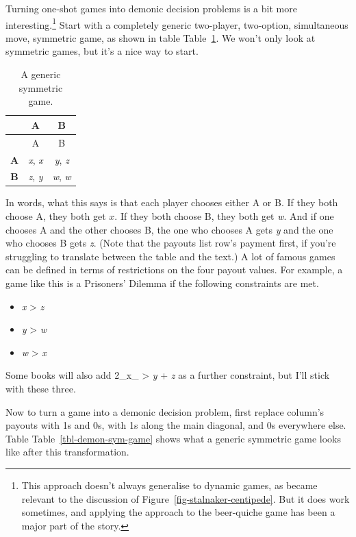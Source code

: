 \documentclass[
  12pt,
  letterpaper,
  DIV=11,
  numbers=noendperiod]{scrreprt}
\providecommand{\tightlist}{%
  \setlength{\itemsep}{0pt}\setlength{\parskip}{0pt}}\usepackage{longtable,booktabs,array}
\begin{document}
Turning one-shot games into demonic decision problems is a bit more
interesting.\footnote{This approach doesn't always generalise to dynamic
  games, as became relevant to the discussion of
  Figure~\ref{fig-stalnaker-centipede}. But it does work sometimes, and
  applying the approach to the beer-quiche game has been a major part of
  the story.} Start with a completely generic two-player, two-option,
simultaneous move, symmetric game, as shown in table
Table~\ref{tbl-basic-sym-game}. We won't only look at symmetric games,
but it's a nice way to start.

\hypertarget{tbl-basic-sym-game}{}
\begin{longtable}[]{@{}ccc@{}}
\caption{\label{tbl-basic-sym-game}A generic symmetric
game.}\tabularnewline
\toprule\noalign{}
& A & B \\
\midrule\noalign{}
\endfirsthead
\toprule\noalign{}
& A & B \\
\midrule\noalign{}
\endhead
\bottomrule\noalign{}
\endlastfoot
\textbf{A} & \emph{x}, \emph{x} & \emph{y}, \emph{z} \\
\textbf{B} & \emph{z}, \emph{y} & \emph{w}, \emph{w} \\
\end{longtable}

In words, what this says is that each player chooses either A or B. If
they both choose A, they both get \(x\). If they both choose B, they
both get \emph{w}. And if one chooses A and the other chooses B, the one
who chooses A gets \emph{y} and the one who chooses B gets \emph{z}.
(Note that the payouts list row's payment first, if you're struggling to
translate between the table and the text.) A lot of famous games can be
defined in terms of restrictions on the four payout values. For example,
a game like this is a Prisoners' Dilemma if the following constraints
are met.

\begin{itemize}
\tightlist
\item
  \emph{x} \textgreater{} \emph{z}
\item
  \emph{y} \textgreater{} \emph{w}
\item
  \emph{w} \textgreater{} \emph{x}
\end{itemize}

Some books will also add 2\_x\_ \textgreater{} \emph{y} + \emph{z} as a
further constraint, but I'll stick with these three.

Now to turn a game into a demonic decision problem, first replace
column's payouts with 1s and 0s, with 1s along the main diagonal, and 0s
everywhere else. Table Table~\ref{tbl-demon-sym-game} shows what a
generic symmetric game looks like after this transformation.
\end{document}
